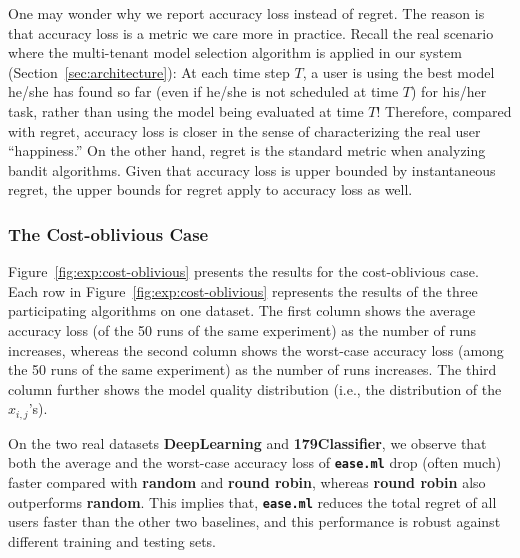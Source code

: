 \documentclass[letterpaper]{vldb}
\newcommand{\eml}{\texttt{ease.ml}\xspace}
\begin{document}
One may wonder why we report accuracy loss instead of regret.
The reason is that accuracy loss is a metric we care more in practice.
Recall the real scenario where the multi-tenant model selection algorithm is applied in our system (Section~\ref{sec:architecture}): At each time step $T$, a user is using the best model he/she has found so far (even if he/she is not scheduled at time $T$) for his/her task, rather than using the model being evaluated at time $T$!
Therefore, compared with regret, accuracy loss is closer in the sense of characterizing the real user ``happiness.''
On the other hand, regret is the standard metric when analyzing bandit algorithms.
Given that accuracy loss is upper bounded by instantaneous regret, the upper bounds for regret apply to accuracy loss as well.%

\subsubsection{The Cost-oblivious Case}

Figure~\ref{fig:exp:cost-oblivious} presents the results for the cost-oblivious case.
Each row in Figure~\ref{fig:exp:cost-oblivious} represents the results of the three participating algorithms on one dataset.
The first column shows the average accuracy loss (of the 50 runs of the same experiment) as the number of runs increases, whereas the second column shows the worst-case accuracy loss (among the 50 runs of the same experiment) as the number of runs increases.
The third column further shows the model quality distribution (i.e., the distribution of the $x_{i,j}$'s).



On the two real datasets {\bf DeepLearning} and {\bf 179Classifier}, we observe that both the average and the worst-case accuracy loss of {\bf \eml} drop (often much) faster compared with {\bf random} and {\bf round robin}, whereas {\bf round robin} also outperforms {\bf random}.
This implies that, {\bf \eml} reduces the total regret of all users faster than the other two baselines, and this performance is robust against different training and testing sets.

\end{document}
